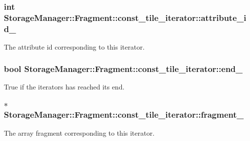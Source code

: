 \subsubsection[{attribute\+\_\+id\+\_\+}]{\setlength{\rightskip}{0pt plus 5cm}int Storage\+Manager\+::\+Fragment\+::const\+\_\+tile\+\_\+iterator\+::attribute\+\_\+id\+\_\+\hspace{0.3cm}{\ttfamily [private]}}\label{classStorageManager_1_1Fragment_1_1const__tile__iterator_a99058e5d1b0fa402ca51afe1935b464c}
The attribute id corresponding to this iterator. \hypertarget{classStorageManager_1_1Fragment_1_1const__tile__iterator_ad88f490d13fdf07a45ed3a2fc37d19b7}{}
\subsubsection[{end\+\_\+}]{\setlength{\rightskip}{0pt plus 5cm}bool Storage\+Manager\+::\+Fragment\+::const\+\_\+tile\+\_\+iterator\+::end\+\_\+\hspace{0.3cm}{\ttfamily [private]}}\label{classStorageManager_1_1Fragment_1_1const__tile__iterator_ad88f490d13fdf07a45ed3a2fc37d19b7}
True if the iterators has reached its end. \hypertarget{classStorageManager_1_1Fragment_1_1const__tile__iterator_a745246a956752c2e9e1470040a95601d}{}
\subsubsection[{fragment\+\_\+}]{$\ast$ Storage\+Manager\+::\+Fragment\+::const\+\_\+tile\+\_\+iterator\+::fragment\+\_\+\hspace{0.3cm}{\ttfamily [private]}}\label{classStorageManager_1_1Fragment_1_1const__tile__iterator_a745246a956752c2e9e1470040a95601d}
The array fragment corresponding to this iterator. \hypertarget{classStorageManager_1_1Fragment_1_1const__tile__iterator_a3b800ee4b5a8358606e261e21b3a56f5}{}
